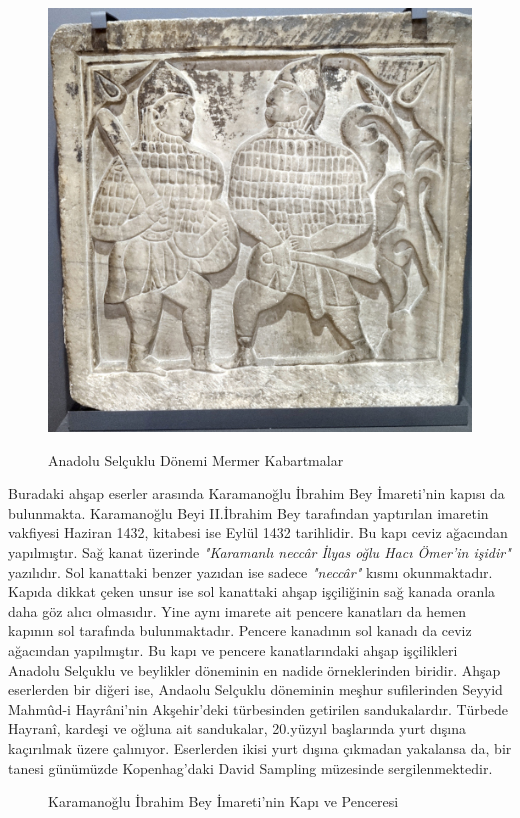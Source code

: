 \begin{figure}[H]
{        \includegraphics[height=0.3\textheight,width=0.3\textheight,keepaspectratio=false]{assets/savasci_as.jpg}
    }
    \caption{Anadolu Selçuklu Dönemi Mermer Kabartmalar}
\end{figure}
\indent Buradaki ahşap eserler arasında Karamanoğlu İbrahim Bey İmareti'nin kapısı da bulunmakta. Karamanoğlu Beyi II.İbrahim Bey tarafından yaptırılan imaretin vakfiyesi Haziran 1432, kitabesi ise Eylül 1432 tarihlidir. Bu kapı ceviz ağacından yapılmıştır. Sağ kanat üzerinde \textit{"Karamanlı neccâr İlyas oğlu Hacı Ömer'in işidir"} yazılıdır. Sol kanattaki benzer yazıdan ise sadece \textit{"neccâr"} kısmı okunmaktadır. Kapıda dikkat çeken unsur ise sol kanattaki ahşap işçiliğinin sağ kanada oranla daha göz alıcı olmasıdır. Yine aynı imarete ait pencere kanatları da hemen kapının sol tarafında bulunmaktadır. Pencere kanadının sol kanadı da ceviz ağacından yapılmıştır. Bu kapı ve pencere kanatlarındaki ahşap işçilikleri Anadolu Selçuklu ve beylikler döneminin en nadide örneklerinden biridir.\cite{dia_6}\newline
\indent Ahşap eserlerden bir diğeri ise, Andaolu Selçuklu döneminin meşhur sufilerinden Seyyid Mahmûd-i Hayrâni'nin Akşehir'deki türbesinden getirilen sandukalardır. Türbede Hayranî, kardeşi ve oğluna ait sandukalar, 20.yüzyıl başlarında yurt dışına kaçırılmak üzere çalınıyor. Eserlerden ikisi yurt dışına çıkmadan yakalansa da, bir tanesi günümüzde Kopenhag'daki David Sampling müzesinde sergilenmektedir.
\begin{figure}[H]
    \centering
    \caption{Karamanoğlu İbrahim Bey İmareti'nin Kapı ve Penceresi}
\end{figure} 
